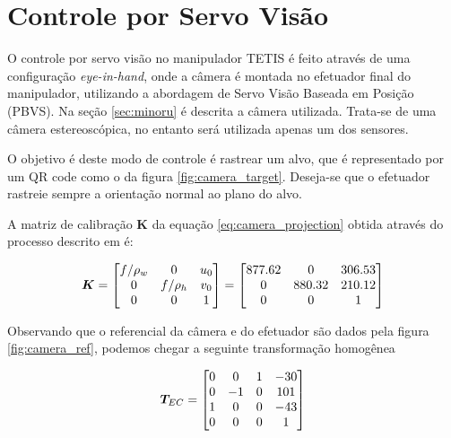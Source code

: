 \section{Controle por Servo Visão} \label{sec:servo_vision}
O controle por servo visão no manipulador TETIS é feito através de uma configuração \textit{eye-in-hand}, onde a câmera é montada no efetuador final do manipulador, utilizando a abordagem de Servo Visão Baseada em Posição (PBVS). Na seção \ref{sec:minoru} é descrita a câmera utilizada. Trata-se de uma câmera estereoscópica, no entanto será utilizada apenas um dos sensores.



O objetivo é deste modo de controle é rastrear um alvo, que é representado por um QR code como o da figura \ref{fig:camera_target}. Deseja-se que o efetuador rastreie sempre a orientação normal ao plano do alvo.

A matriz de calibração $\bm{K}$ da equação \eqref{eq:camera_projection} obtida através do processo descrito em \cite{calibration_tutorial} é:

\begin{equation}
\bm{K} = \begin{bmatrix}
	f/\rho_w & 0 & u_0 \\
	0        & f/\rho_h &v_0 \\
	0 & 0 & 1 \\
\end{bmatrix}
=
\begin{bmatrix}
	877.62 	& 0 		& 306.53 \\
	0  		& 880.32 	& 210.12 \\
	0   	& 0 		& 1 \\	
\end{bmatrix}	
\end{equation}

Observando que o referencial da câmera e do efetuador são dados pela figura \ref{fig:camera_ref}, podemos chegar a seguinte transformação homogênea

\begin{equation} \label{eq:tec}
\bm{T}_{EC} = \begin{bmatrix}
	0 & 0 & 1 & -30 \\
	0 & -1 & 0 & 101 \\
	1 &  0 & 0 & -43 \\
	0 &  0 & 0 &  1
\end{bmatrix}
\end{equation}

